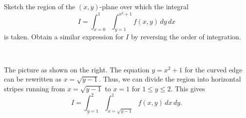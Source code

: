 \documentclass[a4paper]{amsart}
\renewenvironment{solution}{\SolutionInline}{\endSolutionInline}
\begin{document}
\begin{exercise}
 Sketch the region of the $(x,y)$-plane over which the integral 
 \[ I = \int_{x=0}^1 \int_{y=1}^{x^2+1} f(x,y)\,dy\,dx \]
 is taken.  Obtain a similar expression for $I$ by reversing the order
 of integration.
\end{exercise}
\begin{solution}\ \\
 \begin{minipage}[t]{11cm}
  The picture as shown on the right.
  The equation $y=x^2+1$ for the curved edge can be rewritten as
  $x=\sqrt{y-1}$.  Thus, we can divide the region into horizontal
  stripes running from $x=\sqrt{y-1}$ to $x=1$ for $1\leq y\leq 2$.
  This gives
  \[ I = \int_{y=1}^2 \int_{x=\sqrt{y-1}}^{1} f(x,y)\,dx\,dy. \]
 \end{minipage} \hfill \parbox[t]{5cm}{
 }
\end{solution}
\end{document}
